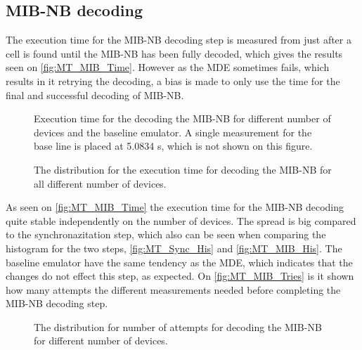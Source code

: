 \subsection{MIB-NB decoding}
The execution time for the MIB-NB decoding step is measured from just after a cell is found until the MIB-NB has been fully decoded, which gives the results seen on \autoref{fig:MT_MIB_Time}. However as the MDE sometimes fails, which results in it retrying the decoding, a bias is made to only use the time for the final and successful decoding of MIB-NB.


\captionsetup{belowskip=0em}
\begin{minipage}{0.48\textwidth}
\begin{figure}[H]
\centering
\resizebox{\textwidth}{!}{
}
\caption{Execution time for the decoding the MIB-NB for different number of devices and the baseline emulator. A single measurement for the base line is placed at 5.0834 s, which is not shown on this figure.}
\label{fig:MT_MIB_Time}
\end{figure}
\end{minipage}%
\hfill
\begin{minipage}{0.48\textwidth}
\begin{figure}[H]
\centering
\resizebox{\textwidth}{!}{
}
\caption{The distribution for the execution time for decoding the MIB-NB for all different number of devices.}
\label{fig:MT_MIB_His}
\end{figure}
\end{minipage}
\captionsetup{belowskip=-1.5em}

As seen on \autoref{fig:MT_MIB_Time} the execution time for the MIB-NB decoding quite stable independently on the number of devices. The spread is big compared to the synchronazitation step, which also can be seen when comparing the histogram for the two steps, \autoref{fig:MT_Sync_His} and \autoref{fig:MT_MIB_His}. The baseline emulator have the same tendency as the MDE, which indicates that the changes do not effect this step, as expected. On \autoref{fig:MT_MIB_Tries} is it shown how many attempts the different measurements needed before completing the MIB-NB decoding step.

\begin{figure}[H]
\centering

\caption{The distribution for number of attempts for decoding the MIB-NB for different number of devices.}
\label{fig:MT_MIB_Tries}
\end{figure}

